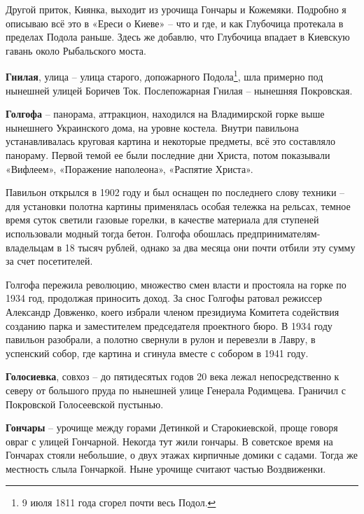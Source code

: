 Другой приток, Киянка, выходит из урочища Гончары и Кожемяки. Подробно я описываю всё это в «Ереси о Киеве» – что и где, и как Глубочица протекала в пределах Подола раньше. Здесь же добавлю, что Глубочица впадает в Киевскую гавань около Рыбальского моста.\\

\medskip

\textbf{Гнилая}, улица – улица старого, допожарного Подола\footnote{9 июля 1811 года сгорел почти весь Подол.}, шла примерно под нынешней улицей Боричев Ток. Послепожарная Гнилая – нынешняя Покровская.\\

\medskip

\textbf{Голгофа} – панорама, аттракцион, находился на Владимирской горке выше нынешнего Украинского дома, на уровне костела. Внутри павильона устанавливалась круговая картина и некоторые предметы, всё это составляло панораму. Первой темой ее были последние дни Христа, потом показывали «Вифлеем», «Поражение наполеона», «Распятие Христа».

    Павильон открылся в 1902 году и был оснащен по последнего слову техники – для установки полотна картины применялась особая тележка на рельсах, темное время суток светили газовые горелки, в качестве материала для ступеней использовали модный тогда бетон. Голгофа обошлась предпринимателям-владельцам в 18 тысяч рублей, однако за два месяца они почти отбили эту сумму за счет посетителей.

    Голгофа пережила революцию, множество смен власти и простояла на горке по 1934 год, продолжая приносить доход. За снос Голгофы ратовал режиссер Александр Довженко, коего избрали членом президиума Комитета содействия созданию парка и заместителем председателя проектного бюро. В 1934 году павильон разобрали, а полотно свернули в рулон и перевезли в Лавру, в успенский собор, где картина и сгинула вместе с собором в 1941 году.\\

\medskip

\textbf{Голосиевка}, совхоз – до пятидесятых годов 20 века лежал непосредственно к северу от большого пруда по нынешней улице Генерала Родимцева. Граничил с Покровской Голосеевской пустынью.\\

\medskip

\textbf{Гончары} – урочище между горами Детинкой и Старокиевской, проще говоря овраг с улицей Гончарной. Некогда тут жили гончары. В советское время на Гончарах стояли небольшие, о двух этажах кирпичные домики с садами. Тогда же местность слыла Гончаркой. Ныне урочище считают частью Воздвиженки.\\

